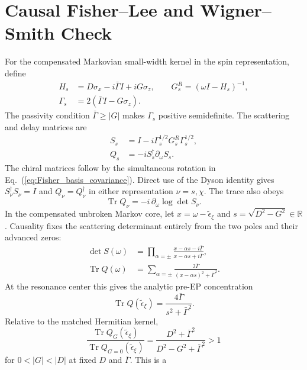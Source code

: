 \documentclass[%
  aps,prb,reprint,amsmath,amssymb,superscriptaddress,longbibliography,floatfix
]{revtex4-2}
\newcommand{\teps}{\tilde{\epsilon}_{\xi}}
\begin{document}
\section{Causal Fisher--Lee and Wigner--Smith Check}
\label{app:smith}

For the compensated Markovian small-width kernel in the spin
representation, define
\begin{align}
H_s&=D\sigma_x-i\bar\Gamma I+iG\sigma_z,\qquad
G_s^R=(\omega I-H_s)^{-1},\\
\Gamma_s&=2(\bar\Gamma I-G\sigma_z).
\end{align}
The passivity condition $\bar\Gamma\geq|G|$ makes
$\Gamma_s$ positive semidefinite.  The scattering and
delay matrices are
\begin{align}
S_s&=I-i\Gamma_s^{1/2}G_s^R\Gamma_s^{1/2},\\
Q_s&=-iS_s^\dagger\partial_\omega S_s .
\end{align}
The chiral matrices follow by the simultaneous rotation in
Eq.~(\ref{eq:Fisher_basis_covariance}).  Direct use of the Dyson identity
gives $S_\nu^\dagger S_\nu=I$ and $Q_\nu=Q_\nu^\dagger$ in either
representation $\nu=s,\chi$.
The trace also obeys
\begin{equation}
\operatorname{Tr}Q_\nu=-i\,\partial_\omega\log\det S_\nu .
\label{eq:smith_det}
\end{equation}
In the compensated unbroken Markov core, let
$x=\omega-\teps$ and $s=\sqrt{D^2-G^2}\in\mathbb R$.  Causality fixes
the scattering determinant entirely from the two poles and their
advanced zeros:
\begin{align}
\det S(\omega)
&=\prod_{\alpha=\pm}
\frac{x-\alpha s-i\bar\Gamma}
     {x-\alpha s+i\bar\Gamma},
\label{eq:detS_two_poles}\\
\operatorname{Tr}Q(\omega)
&=\sum_{\alpha=\pm}
\frac{2\bar\Gamma}
{(x-\alpha s)^2+\bar\Gamma^2}.
\label{eq:smith_two_pole_profile}
\end{align}
At the resonance center this gives the analytic pre-EP concentration
\begin{equation}
\operatorname{Tr}Q(\teps)
=\frac{4\bar\Gamma}{s^2+\bar\Gamma^2}.
\label{eq:smith_center_value}
\end{equation}
Relative to the matched Hermitian kernel,
\begin{equation}
\frac{\operatorname{Tr}Q_G(\teps)}
{\operatorname{Tr}Q_{G=0}(\teps)}
=\frac{D^2+\bar\Gamma^2}
{D^2-G^2+\bar\Gamma^2}>1
\label{eq:smith_preep_ratio}
\end{equation}
for $0<|G|<|D|$ at fixed $D$ and $\bar\Gamma$.  This is a
\end{document}

